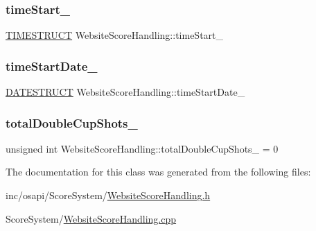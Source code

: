 \subsubsection{\texorpdfstring{time\+Start\+\_\+}{timeStart\_}}
{\footnotesize\ttfamily \hyperlink{struct_website_score_handling_1_1_t_i_m_e_s_t_r_u_c_t}{T\+I\+M\+E\+S\+T\+R\+U\+CT} Website\+Score\+Handling\+::time\+Start\+\_\+\hspace{0.3cm}{\ttfamily [private]}}

\mbox{\label{class_website_score_handling_af393f7cce22756cda28cf109ab68c0e5}} 
\subsubsection{\texorpdfstring{time\+Start\+Date\+\_\+}{timeStartDate\_}}
{\footnotesize\ttfamily \hyperlink{struct_website_score_handling_1_1_d_a_t_e_s_t_r_u_c_t}{D\+A\+T\+E\+S\+T\+R\+U\+CT} Website\+Score\+Handling\+::time\+Start\+Date\+\_\+\hspace{0.3cm}{\ttfamily [private]}}

\mbox{\label{class_website_score_handling_a65a1d48c99c30982ff2b4c92a8c67961}} 
\subsubsection{\texorpdfstring{total\+Double\+Cup\+Shots\+\_\+}{totalDoubleCupShots\_}}
{\footnotesize\ttfamily unsigned int Website\+Score\+Handling\+::total\+Double\+Cup\+Shots\+\_\+ = 0\hspace{0.3cm}{\ttfamily [private]}}



The documentation for this class was generated from the following files\+:\begin{DoxyCompactItemize}
\item 
inc/osapi/\+Score\+System/\hyperlink{_website_score_handling_8h}{Website\+Score\+Handling.\+h}\item 
Score\+System/\hyperlink{_website_score_handling_8cpp}{Website\+Score\+Handling.\+cpp}\end{DoxyCompactItemize}
